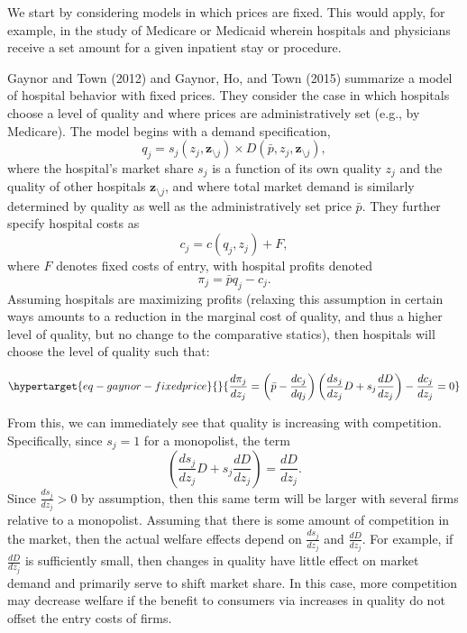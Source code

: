 \documentclass[
  letterpaper,
  DIV=11,
  numbers=noendperiod]{scrreport}
\theoremstyle{definition}
\theoremstyle{remark}
\begin{document}
We start by considering models in which prices are fixed. This would
apply, for example, in the study of Medicare or Medicaid wherein
hospitals and physicians receive a set amount for a given inpatient stay
or procedure.

Gaynor and Town (2012) and Gaynor, Ho, and Town (2015) summarize a model
of hospital behavior with fixed prices. They consider the case in which
hospitals choose a level of quality and where prices are
administratively set (e.g., by Medicare). The model begins with a demand
specification,
\[q_{j}=s_{j}(z_{j}, \mathbf{z}_{\setminus j}) \times D(\bar{p}, z_{j}, \mathbf{z}_{\setminus j}),\]
where the hospital's market share \(s_{j}\) is a function of its own
quality \(z_{j}\) and the quality of other hospitals
\(\mathbf{z}_{\setminus j}\), and where total market demand is similarly
determined by quality as well as the administratively set price
\(\bar{p}\). They further specify hospital costs as
\[c_{j}=c(q_{j},z_{j}) + F,\] where \(F\) denotes fixed costs of entry,
with hospital profits denoted \[\pi_{j} = \bar{p}q_{j} - c_{j}.\]
Assuming hospitals are maximizing profits (relaxing this assumption in
certain ways amounts to a reduction in the marginal cost of quality, and
thus a higher level of quality, but no change to the comparative
statics), then hospitals will choose the level of quality such that:

\begin{equation}\protect\hypertarget{eq-gaynor-fixedprice}{}{\frac{d \pi_{j}}{d z_{j}} = \left(\bar{p} - \frac{d c_{j}}{d q_{j}} \right)\left(\frac{d s_{j}}{d z_{j}}D + s_{j}\frac{d D}{d z_{j}} \right) - \frac{d c_{j}}{d z_{j}}=0}\label{eq-gaynor-fixedprice}\end{equation}

From this, we can immediately see that quality is increasing with
competition. Specifically, since \(s_{j}=1\) for a monopolist, the term
\[\left(\frac{d s_{j}}{d z_{j}}D + s_{j}\frac{d D}{d z_{j}} \right)=\frac{d D}{d z_{j}}.\]
Since \(\frac{d s_{j}}{d z_{j}}>0\) by assumption, then this same term
will be larger with several firms relative to a monopolist. Assuming
that there is some amount of competition in the market, then the actual
welfare effects depend on \(\frac{d s_{j}}{d z_{j}}\) and
\(\frac{d D}{d z_{j}}\). For example, if \(\frac{d D}{d z_{j}}\) is
sufficiently small, then changes in quality have little effect on market
demand and primarily serve to shift market share. In this case, more
competition may decrease welfare if the benefit to consumers via
increases in quality do not offset the entry costs of firms.
\end{document}
